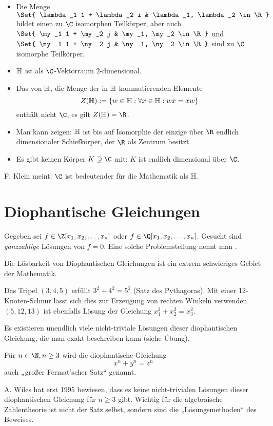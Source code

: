 \begin{itemize}
	\item
		Die Menge $\Set{ \lambda_1 1 + \lambda_2 i & \lambda_1, \lambda_2 \in \R }$ bildet einen zu $\C$ isomorphen Teilkörper, aber auch $\Set{ \my_1 1 + \my_2 j & \my_1, \my_2 \in \R }$ und $\Set{ \ny_1 1 + \ny_2 j & \ny_1, \ny_2 \in \R }$ sind zu $\C$ isomorphe Teilkörper.
	\item
		$\mathbb{H}$ ist als $\C$-Vektorraum $2$-dimensional.
	\item
		Das  von $\mathbb{H}$, die Menge der in $\mathbb{H}$ kommutierenden Elemente
		\[
			Z(\mathbb{H}) := \{ w \in \mathbb{H} : \forall x \in \mathbb{H} : wx = xw \}
		\]
		enthält nicht $\C$, es gilt $Z(\H) = \R$.
	\item
		Man kann zeigen: $\mathbb{H}$ ist bis auf Isomorphie der einzige über $\R$ endlich dimensionaler Schiefkörper, der $\R$ als Zentrum besitzt.
	\item
		Es gibt keinen Körper $K \supsetneq \C$ mit: $K$ ist endlich dimensional über $\C$.
\end{itemize}

F. Klein meint: $\C$ ist bedeutender für die Mathematik als $\mathbb{H}$.


\section{Diophantische Gleichungen}

\begin{df*}
	Gegeben sei $f \in \Z[x_1, x_2, \dotsc, x_n]$ oder $f \in \Q[x_1, x_2, \dotsc, x_n]$.
	Gesucht sind \emph{ganzzahlige} Lösungen von $f = 0$.
	Eine solche Problemstellung nennt man .
\end{df*}
Die Lösbarkeit von Diophantischen Gleichungen ist ein extrem schwieriges Gebiet der Mathematik.

\begin{ex*}
	Das Tripel $(3, 4, 5)$ erfüllt $3^2 + 4^2 = 5^2$ (Satz des Pythagoras).
	Mit einer 12-Knoten-Schnur lässt sich dies zur Erzeugung von rechten Winkeln verwenden.
	$(5, 12, 13)$ ist ebenfalls Lösung der Gleichung $x_1^2 + x_2^2 = x_3^2$.

	Es existieren unendlich viele nicht-triviale Lösungen dieser diophantischen Gleichung, die man exakt beschreiben kann (siehe Übung).
\end{ex*}

\begin{ex*}
	Für $n \in \N, n \ge 3$ wird die diophantische Gleichung
	\[
		x^n + y^n = z^n
	\]
	auch „großer Fermat'scher Satz“ genannt.

	A. Wiles hat erst 1995 bewiesen, dass es keine nicht-trivialen Lösungen dieser diophantischen Gleichung für $n \ge 3$ gibt.
	Wichtig für die algebraische Zahlentheorie ist nicht der Satz selbst, sondern sind die „Lösungsmethoden“ des Beweises.
\end{ex*}

